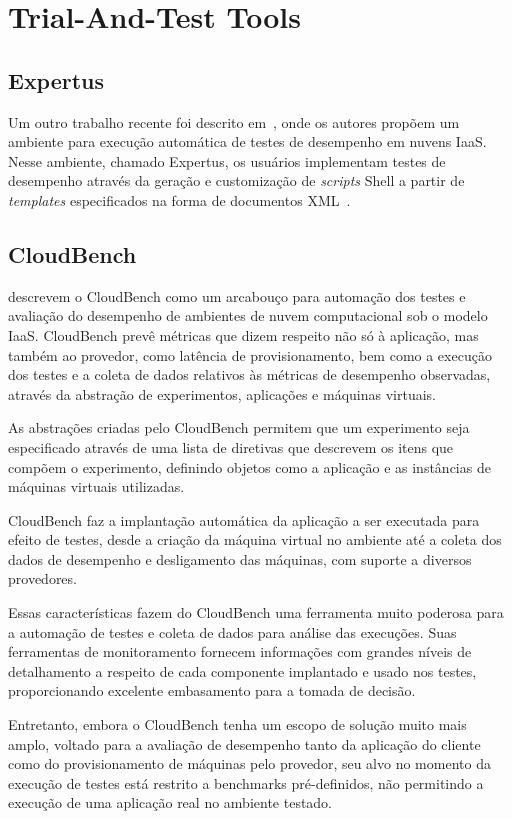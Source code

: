 \section{Trial-And-Test Tools}
\subsection{Expertus}
Um outro trabalho recente foi descrito em~\cite{jayasinghe2012}, onde os autores propõem um ambiente para execução automática de testes de desempenho em nuvens IaaS.  Nesse ambiente, chamado Expertus, os usuários implementam testes de desempenho através da geração e customização de \textit{scripts} Shell a partir de {\em templates} especificados na forma de documentos XML~\cite{jayasinghe2012}. 

\subsection{CloudBench}
\cite{silva2013cloudbench} descrevem o CloudBench como um arcabouço para 
automação dos testes e avaliação do desempenho de ambientes de nuvem computacional 
sob o modelo IaaS. CloudBench prevê métricas que dizem respeito não só à aplicação,
mas também ao provedor, como latência de provisionamento, bem como a execução dos 
testes e a coleta de dados relativos às métricas de desempenho observadas, através 
da abstração de experimentos, aplicações e máquinas virtuais.   

As abstrações criadas pelo CloudBench permitem que um experimento seja 
especificado através de uma lista de diretivas que descrevem os itens
que compõem o experimento, definindo objetos como a aplicação e as instâncias de 
máquinas virtuais utilizadas.

CloudBench faz a implantação automática da aplicação a ser executada para
efeito de testes, desde a criação da máquina virtual no ambiente até a coleta dos
dados de desempenho e desligamento das máquinas, com suporte a diversos provedores.

Essas características fazem do CloudBench uma ferramenta muito poderosa para a
automação de testes e coleta de dados para análise das execuções. Suas ferramentas
de monitoramento fornecem informações com grandes níveis de detalhamento a respeito
de cada componente implantado e usado nos testes, proporcionando excelente embasamento
para a tomada de decisão.

Entretanto, embora o CloudBench tenha um escopo de solução muito mais amplo, 
voltado para a avaliação de desempenho tanto da aplicação do cliente como do 
provisionamento de máquinas pelo provedor, seu alvo no momento da execução de 
testes está restrito a benchmarks pré-definidos, não permitindo a execução de 
uma aplicação real no ambiente testado.

